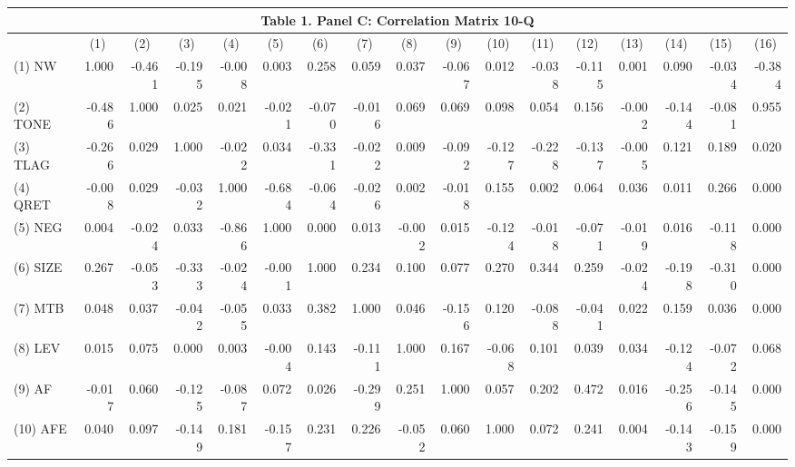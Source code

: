 \begin{table}[htbp] \label{T1PC}
  \centering
    \begin{tabular}{lrrrrrrrrrrrrrrrr}
    \multicolumn{17}{c}{\textbf{Table 1. Panel C: Correlation Matrix 10-Q}} \\
    \midrule
      & \multicolumn{1}{c}{(1)} & \multicolumn{1}{c}{(2)} & \multicolumn{1}{c}{(3)} & \multicolumn{1}{c}{(4)} & \multicolumn{1}{c}{(5)} & \multicolumn{1}{c}{(6)} & \multicolumn{1}{c}{(7)} & \multicolumn{1}{c}{(8)} & \multicolumn{1}{c}{(9)} & \multicolumn{1}{c}{(10)} & \multicolumn{1}{c}{(11)} & \multicolumn{1}{c}{(12)} & \multicolumn{1}{c}{(13)} & \multicolumn{1}{c}{(14)} & \multicolumn{1}{c}{(15)} & \multicolumn{1}{c}{(16)} \\
    \midrule
    (1) NW & 1.000 & -0.461 & -0.195 & -0.008 & 0.003 & 0.258 & 0.059 & 0.037 & -0.067 & 0.012 & -0.038 & -0.115 & 0.001 & 0.090 & -0.034 & -0.384 \\
    (2) TONE & -0.486 & 1.000 & 0.025 & 0.021 & -0.021 & -0.070 & -0.016 & 0.069 & 0.069 & 0.098 & 0.054 & 0.156 & -0.002 & -0.144 & -0.081 & 0.955 \\
    (3) TLAG & -0.266 & 0.029 & 1.000 & -0.022 & 0.034 & -0.331 & -0.022 & 0.009 & -0.092 & -0.127 & -0.228 & -0.137 & -0.005 & 0.121 & 0.189 & 0.020 \\
    (4) QRET & -0.008 & 0.029 & -0.032 & 1.000 & -0.684 & -0.064 & -0.026 & 0.002 & -0.018 & 0.155 & 0.002 & 0.064 & 0.036 & 0.011 & 0.266 & 0.000 \\
    (5) NEG & 0.004 & -0.024 & 0.033 & -0.866 & 1.000 & 0.000 & 0.013 & -0.002 & 0.015 & -0.124 & -0.018 & -0.071 & -0.019 & 0.016 & -0.118 & 0.000 \\
    (6) SIZE & 0.267 & -0.053 & -0.333 & -0.024 & -0.001 & 1.000 & 0.234 & 0.100 & 0.077 & 0.270 & 0.344 & 0.259 & -0.024 & -0.198 & -0.310 & 0.000 \\
    (7) MTB & 0.048 & 0.037 & -0.042 & -0.055 & 0.033 & 0.382 & 1.000 & 0.046 & -0.156 & 0.120 & -0.088 & -0.041 & 0.022 & 0.159 & 0.036 & 0.000 \\
    (8) LEV & 0.015 & 0.075 & 0.000 & 0.003 & -0.004 & 0.143 & -0.111 & 1.000 & 0.167 & -0.068 & 0.101 & 0.039 & 0.034 & -0.124 & -0.072 & 0.068 \\
    (9) AF & -0.017 & 0.060 & -0.125 & -0.087 & 0.072 & 0.026 & -0.299 & 0.251 & 1.000 & 0.057 & 0.202 & 0.472 & 0.016 & -0.256 & -0.145 & 0.000 \\
    (10) AFE & 0.040 & 0.097 & -0.149 & 0.181 & -0.157 & 0.231 & 0.226 & -0.052 & 0.060 & 1.000 & 0.072 & 0.241 & 0.004 & -0.143 & -0.159 & 0.000 \\

\end{tabular}
\end{table}
